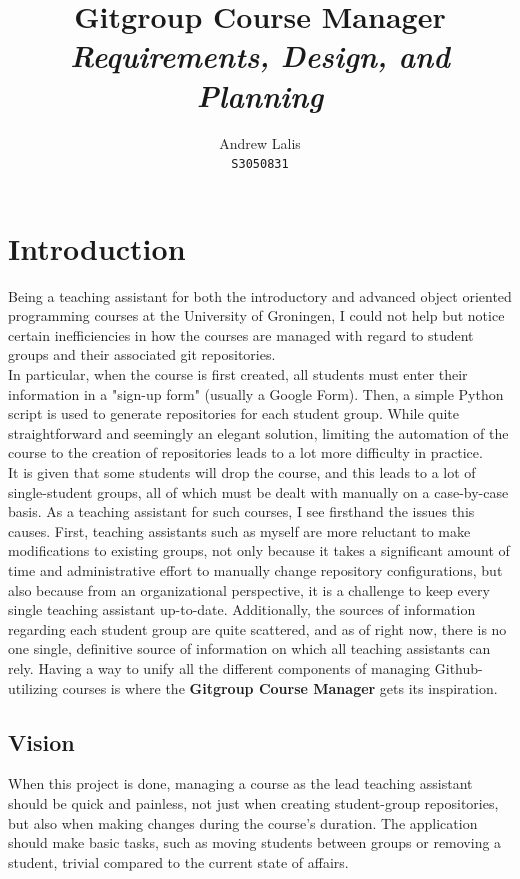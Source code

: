 \documentclass{article}
\title{\textbf{Gitgroup Course Manager}\\
		\textit{Requirements, Design, and Planning}}
\author{Andrew Lalis\\
		\texttt{S3050831}}
\begin{document}
\maketitle

\tableofcontents

\newpage

\section{Introduction}
	Being a teaching assistant for both the introductory and advanced object oriented programming courses at the University of Groningen, I could not help but notice certain inefficiencies in how the courses are managed with regard to student groups and their associated git repositories.\\
	
	\noindent
	In particular, when the course is first created, all students must enter their information in a "sign-up form" (usually a Google Form). Then, a simple Python script is used to generate repositories for each student group. While quite straightforward and seemingly an elegant solution, limiting the automation of the course to the creation of repositories leads to a lot more difficulty in practice.\\
	
	\noindent
	It is given that some students will drop the course, and this leads to a lot of single-student groups, all of which must be dealt with manually on a case-by-case basis. As a teaching assistant for such courses, I see firsthand the issues this causes. First, teaching assistants such as myself are more reluctant to make modifications to existing groups, not only because it takes a significant amount of time and administrative effort to manually change repository configurations, but also because from an organizational perspective, it is a challenge to keep every single teaching assistant up-to-date. Additionally, the sources of information regarding each student group are quite scattered, and as of right now, there is no one single, definitive source of information on which all teaching assistants can rely. Having a way to unify all the different components of managing Github-utilizing courses is where the \textbf{Gitgroup Course Manager} gets its inspiration.
	
	\subsection{Vision}
		When this project is done, managing a course as the lead teaching assistant should be quick and painless, not just when creating student-group repositories, but also when making changes during the course's duration. The application should make basic tasks, such as moving students between groups or removing a student, trivial compared to the current state of affairs.\\
		
\end{document}
